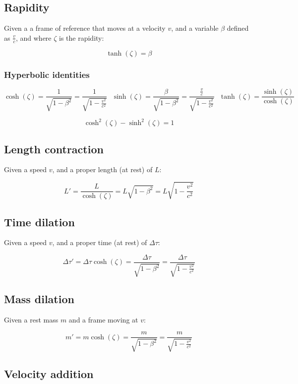 \documentclass[12pt]{article}
\begin{document}
\subsection{Rapidity}

Given a a frame of reference that moves at a velocity $v$, and a variable $\beta$ defined as $\frac{v}{c}$, and where $\zeta$ is the rapidity:

\[
\boxed{
\tanh(\zeta) = \beta
}
\]

\subsubsection{Hyperbolic identities}

\[
\boxed{
\cosh(\zeta) = \frac{1}{\sqrt{1 - \beta^2}} = \frac{1}{\sqrt{1-\frac{v^2}{c^2}}}
}\text{ }
\boxed{
\sinh(\zeta) = \frac{\beta}{\sqrt{1 - \beta^2}} = \frac{\frac{v}{c}}{\sqrt{1-\frac{v^2}{c^2}}}
}\text{ }
\boxed{
\tanh(\zeta) = \frac{\sinh(\zeta)}{\cosh(\zeta)}
}
\]

\[
\boxed{
\cosh^2(\zeta) - \sinh^2(\zeta) = 1
}
\]

\subsection{Length contraction}

Given a speed $v$, and a proper length (at rest) of $L$:

\[
\boxed{
L'=\frac{L}{\cosh(\zeta)}=L\sqrt{1 - \beta^2} = L\sqrt{1 - \frac{v^2}{c^2}}
}
\]

\subsection{Time dilation}

Given a speed $v$, and a proper time (at rest) of $\Delta\tau$:

\[
\boxed{
\Delta\tau' = \Delta\tau\cosh(\zeta) = \frac{\Delta\tau}{\sqrt{1 - \beta^2}} = \frac{\Delta\tau}{\sqrt{1 - \frac{v^2}{c^2}}}
}
\]

\subsection{Mass dilation}

Given a rest mass $m$ and a frame moving at $v$:

\[
\boxed{
m' = m\cosh(\zeta) = \frac{m}{\sqrt{1 - \beta^2}} = \frac{m}{\sqrt{1 - \frac{v^2}{c^2}}}
}
\]

\subsection{Velocity addition}
\end{document}
